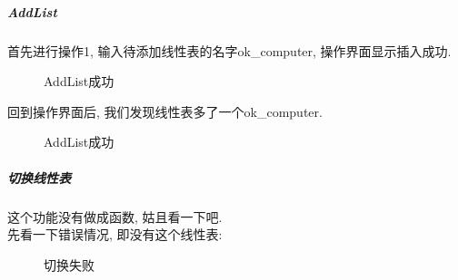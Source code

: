 \documentclass[supercite]{Experimental_Report}
\theoremstyle{definition}
\begin{document}
\subparagraph{AddList}
\noindent
首先进行操作1, 输入待添加线性表的名字ok\_computer, 操作界面显示插入成功.
\begin{figure}[htbp]
	\centering
	\centering
	\caption{AddList成功}
	\label{fig2-2}
\end{figure}

\noindent
回到操作界面后, 我们发现线性表多了一个ok\_computer.
\begin{figure}[htbp]
	\centering
	\centering
	\caption{AddList成功}
	\label{fig2-3}
\end{figure}

\clearpage
\subparagraph{切换线性表}
\noindent
这个功能没有做成函数, 姑且看一下吧.\\
先看一下错误情况, 即没有这个线性表:
\begin{figure}[htbp]
	\centering
	\centering
	\caption{切换失败}
	\label{fig2-4}
\end{figure}
\end{document}
